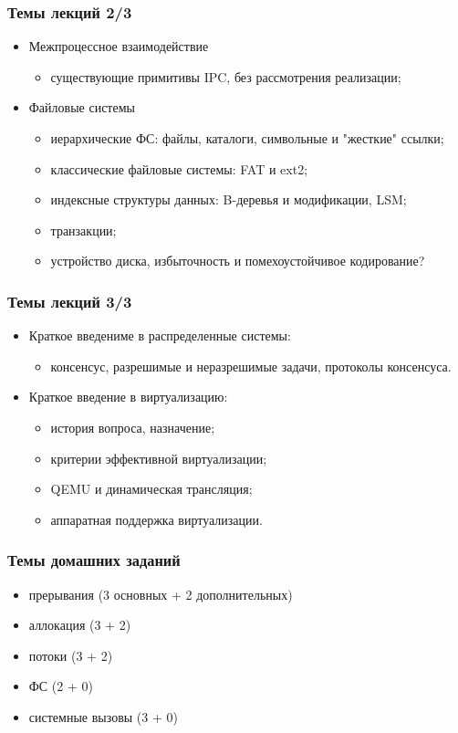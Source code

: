 \begin{frame}
\frametitle{Темы лекций 2/3}
\begin{itemize}
  \item Межпроцессное взаимодействие
  \begin{itemize}
    \item существующие примитивы IPC, без рассмотрения реализации;
  \end{itemize}
  \item Файловые системы
  \begin{itemize}
    \item иерархические ФС: файлы, каталоги, символьные и "жесткие" ссылки;
    \item классические файловые системы: FAT и ext2;
    \item индексные структуры данных: B-деревья и модификации, LSM;
    \item транзакции;
    \item устройство диска, избыточность и помехоустойчивое кодирование?
  \end{itemize}
\end{itemize}
\end{frame}

\begin{frame}
\frametitle{Темы лекций 3/3}
\begin{itemize}
  \item Краткое введениме в распределенные системы:
  \begin{itemize}
    \item консенсус, разрешимые и неразрешимые задачи, протоколы консенсуса.
  \end{itemize}
  \item Краткое введение в виртуализацию:
  \begin{itemize}
    \item история вопроса, назначение;
    \item критерии эффективной виртуализации;
    \item QEMU и динамическая трансляция;
    \item аппаратная поддержка виртуализации.
  \end{itemize}
\end{itemize}
\end{frame}

\begin{frame}
\frametitle{Темы домашних заданий}
\begin{itemize}
  \item прерывания (3 основных + 2 дополнительных)
  \item аллокация (3 + 2)
  \item потоки (3 + 2)
  \item ФС (2 + 0)
  \item системные вызовы (3 + 0)
\end{itemize}
\end{frame}

